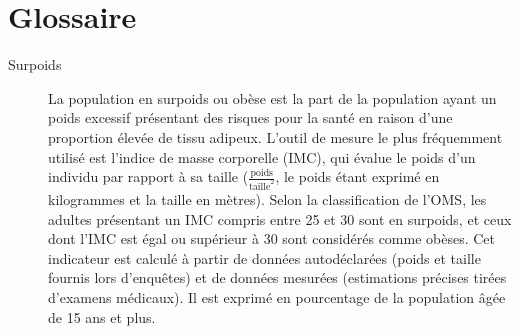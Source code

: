\section*{Glossaire}\label{sec:glossaire}

\begin{description}
    \item [Surpoids]\label{itm:surpoids}
    {
        La population en surpoids ou obèse est la part de la population ayant un poids excessif présentant des risques
        pour la santé en raison d'une proportion élevée de tissu adipeux.
        L'outil de mesure le plus fréquemment utilisé est l'indice de masse corporelle (IMC), qui évalue le poids d'un
        individu par rapport à sa taille ($\frac{\text{poids}}{\text{taille}^2}$,
        le poids étant exprimé en kilogrammes et la taille en mètres).
        Selon la classification de l'OMS, les adultes présentant un IMC compris entre 25 et 30 sont en surpoids, et ceux
        dont l'IMC est égal ou supérieur à 30 sont considérés comme obèses.
        Cet indicateur est calculé à partir de données autodéclarées (poids et taille fournis lors d'enquêtes) et de
        données mesurées (estimations précises tirées d'examens médicaux).
        Il est exprimé en pourcentage de la population âgée de 15 ans et plus.
    }
\end{description}